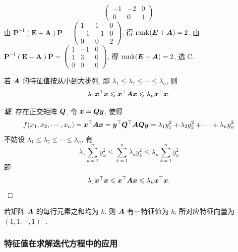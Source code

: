 \begin{solution}
$$\begin{pmatrix}
    -1 & -2 & 0 \\
    0 & 0 & 1\end{pmatrix}
$$
由 $ \boldsymbol{P}^{-1}(\boldsymbol{E}+\boldsymbol{A}) \boldsymbol{P}=\begin{pmatrix}1 & 1 & 0 \\ -1 & -1 & 0 \\ 0 & 0 & 2\end{pmatrix} $, 得 $ \rank(\boldsymbol{E}+\boldsymbol{A})=2 $.
由 $ \boldsymbol{P}^{-1}(\boldsymbol{E}-\boldsymbol{A}) \boldsymbol{P}=\begin{pmatrix}1 & -1 & 0 \\ 1 & 3 & 0 \\ 0 & 0 & 0\end{pmatrix} $, 得 $ \rank(\boldsymbol{E}-\boldsymbol{A})=2 $, 选 C.
\end{solution}

\begin{theorem}[特征值不等式]
    \label{tzzbds}若 $\vb*{A}$ 的特征值按从小到大排列, 即 $\lambda_1\leqslant \lambda_2\leqslant \cdots\leqslant \lambda_n$, 则 $$\lambda_1\vb*{x}^\top\vb*{x}\leqslant \vb*{x}^\top\vb*{Ax}\leqslant \lambda_n\vb*{x}^\top\vb*{x}.$$
\end{theorem}
\begin{proof}[{\songti \textbf{证}}]
    存在正交矩阵 $\vb*{Q}$, 令 $\vb*{x}=\vb*{Qy}$, 使得 $$f(x_1,x_2,\cdots,x_n)=\vb*{x}^\top\vb*{Ax}=\vb*{y}^\top\vb*{Q}^\top\vb*{AQy}=\lambda_1y_1^2+\lambda_2y_2^2+\cdots+\lambda_ny_n^2$$
    不妨设 $\lambda_1\leqslant \lambda_2\leqslant\cdots\leqslant\lambda_n$, 有 
    $$\lambda_1\sum_{k=1}^{n}y_k^2\leqslant \sum_{k=1}^{n}\lambda_ky_k^2\leqslant \lambda_n\sum_{k=1}^{n}y_k^2$$
    即 $$\lambda_1\vb*{x}^\top\vb*{x}\leqslant \vb*{x}^\top\vb*{Ax}\leqslant \lambda_n\vb*{x}^\top\vb*{x}.$$
\end{proof}

\begin{theorem}[行均和定理]
    \label{hangjunhedl}若矩阵 $\vb*{A}$ 的每行元素之和均为 $k$, 则 $\vb*{A}$ 有一特征值为 $k$, 所对应特征向量为 $(1,1,\cdots,1)^\top.$
\end{theorem}

\subsubsection{特征值在求解迭代方程中的应用}

